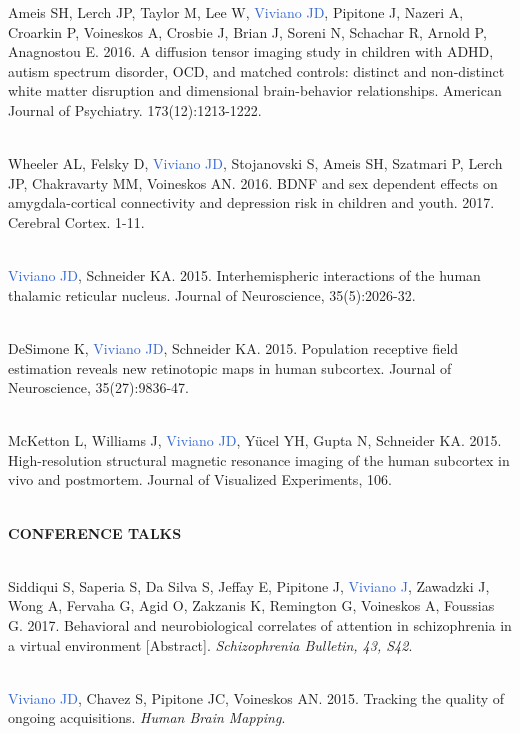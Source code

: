 \documentclass[a4paper,11pt,oneside]{book}
\newcommand\sectionheading{
    \normalsize
    \noindent
    \leftskip=0in
    \textbf
}
\begin{document}
\begin{flushleft}
Ameis SH, Lerch JP, Taylor M, Lee W, \textcolor{highlight}{Viviano JD}, Pipitone J, Nazeri A, Croarkin P, Voineskos A, Crosbie J, Brian J, Soreni N, Schachar R, Arnold P, Anagnostou E. 2016. A diffusion tensor imaging study in children with ADHD, autism spectrum disorder, OCD, and matched controls: distinct and non-distinct white matter disruption and dimensional brain-behavior relationships. American Journal of Psychiatry. 173(12):1213-1222. \\\

Wheeler AL, Felsky D, \textcolor{highlight}{Viviano JD}, Stojanovski S, Ameis SH, Szatmari P, Lerch JP, Chakravarty MM, Voineskos AN. 2016. BDNF and sex dependent effects on amygdala-cortical connectivity and depression risk in children and youth. 2017. Cerebral Cortex. 1-11. \\\

\textcolor{highlight}{Viviano JD}, Schneider KA. 2015. Interhemispheric interactions of the human thalamic reticular nucleus. Journal of Neuroscience, 35(5):2026-32. \\\

DeSimone K, \textcolor{highlight}{Viviano JD}, Schneider KA. 2015. Population receptive field estimation reveals new retinotopic maps in human subcortex. Journal of Neuroscience, 35(27):9836-47. \\\

McKetton L, Williams J, \textcolor{highlight}{Viviano JD}, Yücel YH, Gupta N, Schneider KA. 2015. High-resolution structural magnetic resonance imaging of the human subcortex in vivo and postmortem. Journal of Visualized Experiments, 106. \\\

\sectionheading{CONFERENCE TALKS} \\\

Siddiqui S, Saperia S, Da Silva S, Jeffay E, Pipitone J, \textcolor{highlight}{Viviano J}, Zawadzki J, Wong A, Fervaha G, Agid O, Zakzanis K, Remington G, Voineskos A, Foussias G. 2017. Behavioral and neurobiological correlates of attention in schizophrenia in a virtual environment [Abstract]. \textit{Schizophrenia Bulletin, 43, S42}. \\\

\textcolor{highlight}{Viviano JD}, Chavez S, Pipitone JC, Voineskos AN. 2015. Tracking the quality of ongoing acquisitions. \textit{Human Brain Mapping}. \\\


\end{flushleft}
\end{document}
